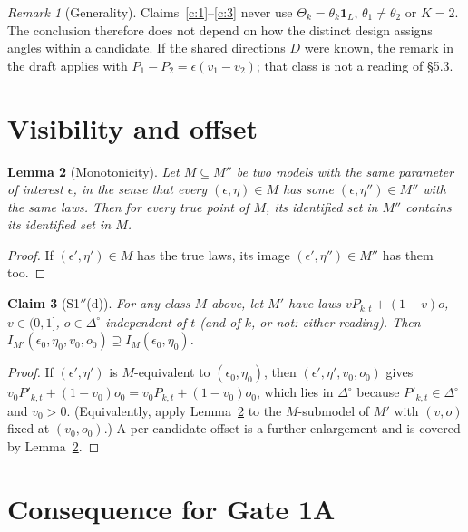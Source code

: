 \documentclass[11pt,a4paper]{article}
\newtheorem{theorem}{Claim}
\newtheorem{lemma}[theorem]{Lemma}
\theoremstyle{remark}
\newtheorem{remark}[theorem]{Remark}
\newcommand{\simp}{\Delta^{\circ}}
\newcommand{\eps}{\epsilon}
\begin{document}
\begin{remark}[Generality]\label{rem:gen}
Claims~\ref{c:1}--\ref{c:3} never use $\Theta_k=\theta_k\mathbf 1_L$, $\theta_1\neq\theta_2$
or $K=2$. The conclusion therefore does not depend on how the distinct design assigns
angles within a candidate. If the shared directions $D$ were known, the remark in the draft
applies with $P_1-P_2=\eps(v_1-v_2)$; that class is not a reading of §5.3.
\end{remark}

\section{Visibility and offset}

\begin{lemma}[Monotonicity]\label{lem:mono}
Let $M\subseteq M''$ be two models with the same parameter of interest $\eps$, in the sense
that every $(\eps,\eta)\in M$ has some $(\eps,\eta'')\in M''$ with the same laws. Then for
every true point of $M$, its identified set in $M''$ contains its identified set in $M$.
\end{lemma}
\begin{proof}
If $(\eps',\eta')\in M$ has the true laws, its image $(\eps',\eta'')\in M''$ has them too.
\end{proof}

\begin{theorem}[S1$''$(d)]\label{c:4}
For any class $M$ above, let $M'$ have laws $vP_{k,t}+(1-v)o$, $v\in(0,1]$, $o\in\simp$
independent of $t$ (and of $k$, or not: either reading). Then
$I_{M'}(\eps_0,\eta_0,v_0,o_0)\supseteq I_M(\eps_0,\eta_0)$.
\end{theorem}
\begin{proof}
If $(\eps',\eta')$ is $M$-equivalent to $(\eps_0,\eta_0)$, then
$(\eps',\eta',v_0,o_0)$ gives $v_0P'_{k,t}+(1-v_0)o_0=v_0P_{k,t}+(1-v_0)o_0$, which lies in
$\simp$ because $P'_{k,t}\in\simp$ and $v_0>0$. (Equivalently, apply
Lemma~\ref{lem:mono} to the $M$-submodel of $M'$ with $(v,o)$ fixed at $(v_0,o_0)$.)
A per-candidate offset is a further enlargement and is covered by Lemma~\ref{lem:mono}.
\end{proof}

\section{Consequence for Gate 1A}
\end{document}
